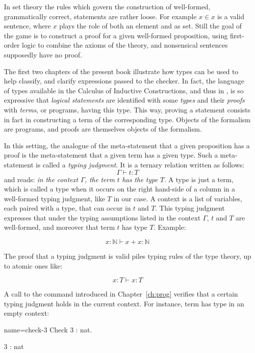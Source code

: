 In set theory the rules which govern the construction of
well-formed, grammatically correct, statements are rather loose.
For example
$x \in x$ is a valid sentence, where $x$ plays the role of
both an element and as set. Still the
goal of the game is to construct a proof for a given well-formed
proposition, using first-order logic to combine the axioms of the
theory, and nonsensical sentences supposedly have no proof.

The first two chapters of the present book illustrate how
types can be used to help classify, and clarify expressions passed to
the checker. In fact, the language of types available in the Calculus
of Inductive Constructions, and thus in  \Coq{}, is so expressive that
\emph{logical statements} are identified with some \emph{types} and
their \emph{proofs} with \emph{terms}, or programs, having this
type. This way, proving a statement consists in fact in constructing a
term of the corresponding type. Objects of the formalism are programs,
and proofs are themselves objects of the formalism.

In this setting, the analogue of the meta-statement
that a given proposition has a proof is the meta-statement that a
given term has a given type. Such a meta-statement is called a
\emph{typing judgment}. It is a ternary relation written as follows:
$$\Gamma \vdash t : T$$
and reads:
\emph{in the context $\Gamma$, the term $t$ has the type $T$}. A type
is just a term, which is called a type when it occurs on the right
hand-side of a column in a well-formed typing judgment, like $T$ in
our case. A context is a list of variables, each paired with a type,
that can occur in $t$ and $T$. This typing judgment expresses that
under the typing assumptions listed in the context $\Gamma$, $t$ and
$T$ are well-formed, and moreover that term $t$ has type $T$. Example:

$$x : \mathbb{N} \vdash x + x : \mathbb{N}$$


The proof that a typing judgment is valid piles typing rules of the
type theory, up to atomic ones like:

$$x : T \vdash x : T$$


A call to the  command introduced in Chapter~\ref{ch:prog} 
verifies that a certain typing judgment holds in the current
context. For instance, term  has type  in an empty context:

\begin{coq-left}{name=check-3}{}
Check 3 : nat.
\end{coq-left}
\begin{coqout-right}
3 : nat
\end{coqout-right}


